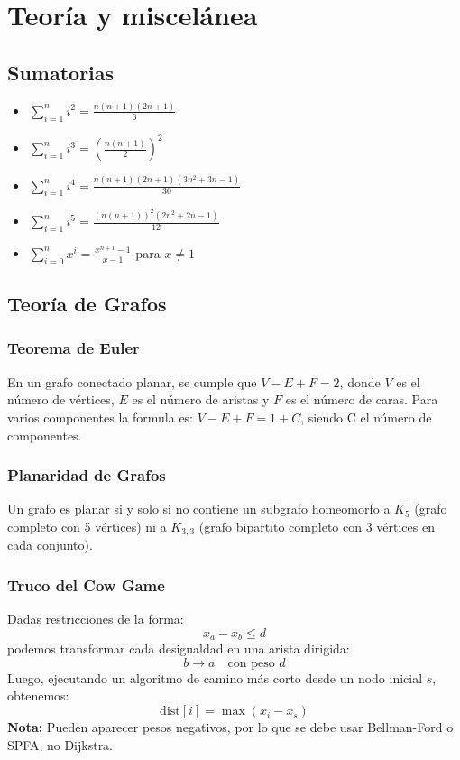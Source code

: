 \section{Teoría y miscelánea}

\subsection{Sumatorias}
\begin{multicols}{2}
\begin{itemize}
    \item $\sum_{i=1}^{n} i^2 = \frac{n(n+1)(2n+1)}{6}$
    \item $\sum_{i=1}^{n} i^3 = \left(\frac{n(n+1)}{2}\right)^2$
    \item $\sum_{i=1}^{n} i^4 = \frac{n(n+1)(2n+1)(3n^2+3n-1)}{30}$
    \item $\sum_{i=1}^{n} i^5 = \frac{(n(n+1))^2(2n^2+2n-1)}{12}$
    \item $\sum_{i=0}^{n} x^i = \frac{x^{n+1}-1}{x-1}$ para $x \neq 1$
\end{itemize}
\end{multicols}

\subsection{Teoría de Grafos}
\subsubsection{Teorema de Euler}
En un grafo conectado planar, se cumple que $V - E + F = 2$, donde $V$ es el número de vértices, $E$ es el número de aristas y $F$ es el número de caras.
Para varios componentes la formula es: $V - E + F = 1 + C$, siendo C el número de componentes.

\subsubsection{Planaridad de Grafos}
Un grafo es planar si y solo si no contiene un subgrafo homeomorfo a $K_5$ (grafo completo con 5 vértices) ni a $K_{3,3}$ (grafo bipartito completo con 3 vértices en cada conjunto).

\subsubsection{Truco del Cow Game}
Dadas restricciones de la forma:
\[
x_a - x_b \leq d
\]
podemos transformar cada desigualdad en una arista dirigida:
\[
b \to a \quad \text{con peso } d
\]
Luego, ejecutando un algoritmo de camino más corto desde un nodo inicial \(s\), obtenemos:
\[
\text{dist}[i] = \max(x_i - x_s)
\]
\textbf{Nota:} Pueden aparecer pesos negativos, por lo que se debe usar Bellman-Ford o SPFA, no Dijkstra.

